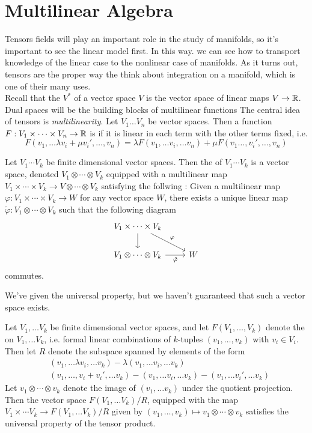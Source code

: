 %
\section{Multilinear Algebra}
%
Tensors fields will play an important role in the study of manifolds, so
it's important to see the linear model first. In this way. we can see how
to transport knowledge of the linear case to the nonlinear case of
manifolds. As it turns out, tensors are the proper way the think about
integration on a manifold, which is one of their many uses. \\
%
Recall that the  $V^*$ of a vector space $V$ is the vector space
of linear maps $V \to \mathbb{R}$. Dual spaces will be the building blocks of
multilinear functions The central idea of tensors is \emph{multilinearity}.
Let $V_1 \ldots V_n$ be vector spaces. Then a function
$F : V_1 \times \cdots \times V_n \to \mathbb{R}$ is  if it is linear
in each term with the other terms fixed, i.e.
$$F(v_1, \ldots \lambda v_i + \mu v_i', \ldots, v_n) =
\lambda F(v_1, \ldots v_i, \ldots v_n) +
\mu F(v_1 \ldots, v_i', \ldots, v_n)$$
%
\begin{defn}
Let $V_1 \cdots V_k$ be finite dimensional vector spaces. Then the
 of $V_1 \cdots V_k$ is a vector space, denoted
$V_1 \otimes \cdots \otimes V_k$ equipped with a multilinear map
$V_1 \times \cdots \times V_k \to V \otimes \cdots \otimes V_k$ satisfying
the follwing  : Given a multilinear map
$\varphi : V_1 \times \cdots \times V_k \to W$ for any vector space $W$,
there exists a unique linear map
$\tilde{\varphi} : V_1 \otimes \cdots \otimes V_k$ such that the following
diagram
$$\begin{tikzcd}
V_1 \times \cdots \times V_k \ar[dr, "\varphi"] \ar[d] \\
V_1 \otimes \cdots \otimes V_k \ar[r, "\tilde{\varphi}"'] & W
\end{tikzcd}$$
commutes.
\end{defn}
%
We've given the universal property, but we haven't guaranteed that such
a vector space exists.
%
\begin{thm}
Let $V_1, \ldots V_k$ be finite dimensional vector spaces, and let
$F(V_1, \ldots, V_k)$ denote the  on
$V_1, \ldots V_k$, i.e. formal linear combinations of $k$-tuples
$(v_1,\ldots,v_k)$ with $v_i \in V_i$. Then let $R$ denote the subspace
spanned by elements of the form
\begin{align*}
&(v_1, \ldots \lambda v_i, \ldots v_k) -
\lambda (v_1, \ldots v_i, \ldots v_k)\\
&(v_1, \ldots, v_i + v_i', \ldots v_k) - (v_1, \ldots v_i, \ldots v_k)
- (v_1, \ldots v_i', \ldots v_k)
\end{align*}
Let $v_1 \otimes \cdots \otimes v_k$ denote the image of $(v_1, \ldots v_k)$
under the quotient projection. Then the vector space $F(V_1, \ldots V_k) / R$,
equipped with the map $V_1 \times \cdots V_k \to F(V_1, \ldots V_k) / R$ given
by $(v_1, \ldots, v_k) \mapsto v_1 \otimes \cdots \otimes v_k$ satisfies the
universal property of the tensor product.
\end{thm}
